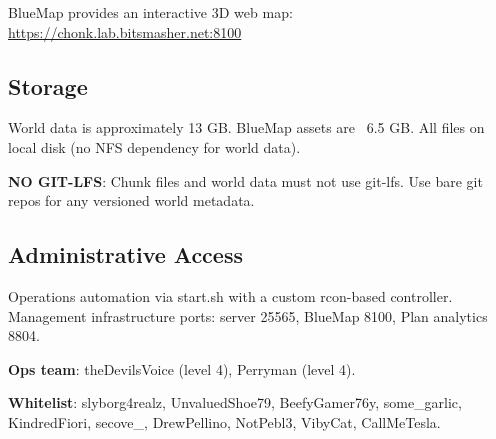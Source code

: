 BlueMap provides an interactive 3D web map: \url{https://chonk.lab.bitsmasher.net:8100}

\subsection{Storage}

World data is approximately 13 GB. BlueMap assets are ~6.5 GB. All files on local disk (no NFS dependency for world data).

\textbf{NO GIT-LFS}: Chunk files and world data must not use git-lfs. Use bare git repos for any versioned world metadata.

\subsection{Administrative Access}

Operations automation via start.sh with a custom rcon-based controller. Management infrastructure ports: server 25565, BlueMap 8100, Plan analytics 8804.

\textbf{Ops team}: theDevilsVoice (level 4), Perryman (level 4).

\textbf{Whitelist}: slyborg4realz, UnvaluedShoe79, BeefyGamer76y, some_garlic, KindredFiori, secove_, DrewPellino, NotPebl3, VibyCat, CallMeTesla.
